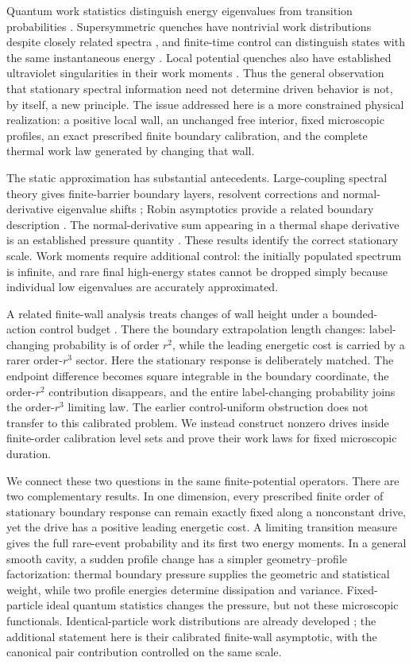 \documentclass[aps,pra,reprint,superscriptaddress,longbibliography]{revtex4-2}
\begin{document}
Quantum work statistics distinguish energy eigenvalues from transition probabilities \cite{Talkner,Campisi}. Supersymmetric quenches have nontrivial work distributions despite closely related spectra \cite{CampbellQuench}, and finite-time control can distinguish states with the same instantaneous energy \cite{CampbellControl}. Local potential quenches also have established ultraviolet singularities in their work moments \cite{Sindona}. Thus the general observation that stationary spectral information need not determine driven behavior is not, by itself, a new principle. The issue addressed here is a more constrained physical realization: a positive local wall, an unchanged free interior, fixed microscopic profiles, an exact prescribed finite boundary calibration, and the complete thermal work law generated by changing that wall.

The static approximation has substantial antecedents. Large-coupling spectral theory gives finite-barrier boundary layers, resolvent corrections and normal-derivative eigenvalue shifts \cite{BruneauCarbou,Nguyen,HintzMoser}; Robin asymptotics provide a related boundary description \cite{Ognibene}. The normal-derivative sum appearing in a thermal shape derivative is an established pressure quantity \cite{ElSoufi}. These results identify the correct stationary scale. Work moments require additional control: the initially populated spectrum is infinite, and rare final high-energy states cannot be dropped simply because individual low eigenvalues are accurately approximated.

A related finite-wall analysis treats changes of wall height under a bounded-action control budget \cite{ChandruRare}. There the boundary extrapolation length changes: label-changing probability is of order $r^2$, while the leading energetic cost is carried by a rarer order-$r^3$ sector. Here the stationary response is deliberately matched. The endpoint difference becomes square integrable in the boundary coordinate, the order-$r^2$ contribution disappears, and the entire label-changing probability joins the order-$r^3$ limiting law. The earlier control-uniform obstruction does not transfer to this calibrated problem. We instead construct nonzero drives inside finite-order calibration level sets and prove their work laws for fixed microscopic duration.

We connect these two questions in the same finite-potential operators. There are two complementary results. In one dimension, every prescribed finite order of stationary boundary response can remain exactly fixed along a nonconstant drive, yet the drive has a positive leading energetic cost. A limiting transition measure gives the full rare-event probability and its first two energy moments. In a general smooth cavity, a sudden profile change has a simpler geometry--profile factorization: thermal boundary pressure supplies the geometric and statistical weight, while two profile energies determine dissipation and variance. Fixed-particle ideal quantum statistics changes the pressure, but not these microscopic functionals. Identical-particle work distributions are already developed \cite{Gong}; the additional statement here is their calibrated finite-wall asymptotic, with the canonical pair contribution controlled on the same scale.
\end{document}
